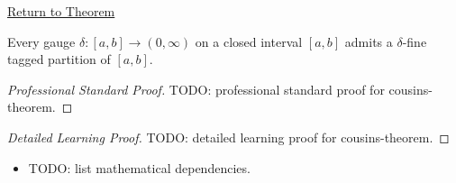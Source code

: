 \newpage
{}
\label{prf:cousins-theorem}

\begin{remark*}[Return]
\hyperref[thm:cousins-theorem]{Return to Theorem}
\end{remark*}

\begin{theorem*}
Every gauge $\delta:[a,b]\to(0,\infty)$ on a closed interval $[a,b]$
admits a $\delta$-fine tagged partition of $[a,b]$.
\end{theorem*}

\begin{proof}[Professional Standard Proof]
\LRAProofBodyStart
TODO: professional standard proof for cousins-theorem.
\end{proof}

\begin{proof}[Detailed Learning Proof]
\LRAProofBodyStart
TODO: detailed learning proof for cousins-theorem.
\end{proof}

\begin{remark*}
\end{remark*}

\begin{dependencies}
\begin{itemize}
  \item TODO: list mathematical dependencies.
\end{itemize}
\end{dependencies}

\clearpage
